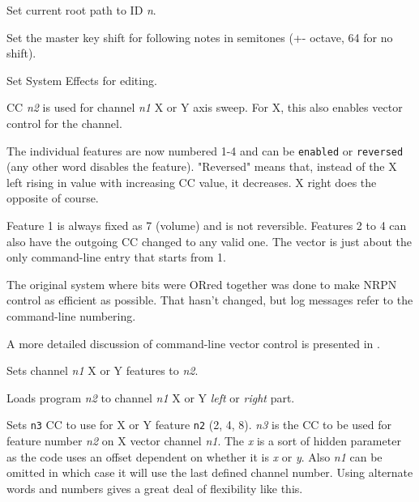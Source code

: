       Set current root path to ID \textsl{n}.

      Set the master key shift for following notes in semitones (+-
      octave, 64 for no shift).

      Set System Effects for editing.

      CC \textsl{n2} is used for channel \textsl{n1} X or Y axis sweep.
      For X, this also enables vector control for the channel.

      The individual features are now numbered 1-4 and can be
       \texttt{enabled} or
       \texttt{reversed} (any
      other word disables the feature).
      "Reversed" means that, instead of the X left rising in
      value with increasing CC value, it decreases.
      X right does the opposite of course.

      Feature 1 is always fixed as 7 (volume) and is not reversible.
      Features 2 to 4 can also have the outgoing CC changed to any valid one.
      The vector is just about the only command-line
      entry that starts from 1.

      The original system where bits were ORred together was done to make
      NRPN control as efficient as possible. That hasn't changed, but log
      messages refer to the command-line numbering.

      A more detailed discussion of command-line vector control is presented
      in .

      Sets channel \textsl{n1} X or Y features to \textsl{n2}.

      Loads program \textsl{n2} to channel \textsl{n1} X or Y
      \textsl{left} or \textsl{right} part.

      Sets \texttt{n3} CC to use for X or Y feature \texttt{n2} (2, 4, 8).
      \textsl{n3} is the CC to be used for feature number \textsl{n2} on X
      vector channel \textsl{n1}. The \textsl{x} is a sort of hidden
      parameter as the code uses an offset dependent on whether it is
      \textsl{x} or \textsl{y}. Also \textsl{n1} can be omitted in which case
      it will use the last defined channel number. Using alternate words and
      numbers gives a great deal of flexibility like this.

